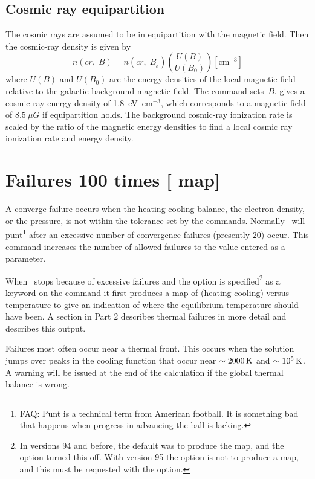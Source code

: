 \subsection{Cosmic ray equipartition}

The cosmic rays are assumed to be in equipartition with the magnetic
field.
Then the cosmic-ray density is given by
\begin{equation}
n\left( {cr,\;B} \right) = n\left( {cr,\;B_{_0 } } \right)\left(
{\frac{{U\left( B \right)}}{{U\left( {B_0 } \right)}}} \right)
[\mathrm{cm}^{-3}]%
\end{equation}
where $U(B)$ and $U(B_0)$ are the energy densities of the local
magnetic field
relative to the galactic background magnetic field.
The 
command sets~$B$.  \citet{Webber1998} gives a cosmic-ray
energy density of 1.8~eV~cm$^{-3}$,
which corresponds to a magnetic field of
$8.5~\mu G$ if equipartition holds.
The background cosmic-ray ionization rate
is scaled by the ratio of the magnetic energy densities to find a local
cosmic ray ionization rate and energy density.

\section{Failures 100 times [ map]}

A converge failure occurs when the heating-cooling balance,
the electron
density, or the pressure, is not within the tolerance set by the
 commands.
Normally \Cloudy\ will
punt\footnote{FAQ:  Punt is a technical term from American football.
It is
something bad that happens when progress in advancing the ball is lacking.}
after an excessive number of convergence failures (presently 20)
occur.
This command increases the number of allowed failures to the value
entered as a parameter.

When \Cloudy\ stops because of excessive failures and the
 option is
specified\footnote{In versions 94 and before,
the default was to produce the map, and
the  option turned this off.
With version 95 the option is not to
produce a map, and this must be requested with the
 option.}
as a keyword on the  command it first
produces a map
of (heating-cooling) versus temperature to give an indication
of where the
equilibrium temperature should have been.
A section in Part 2 describes
thermal failures in more detail and describes this output.

Failures most often occur near a thermal front.
This occurs when the
solution jumps over peaks in the cooling function that occur near
$\sim2000 {\rm\thinspace K}$ and $\sim 10^5 {\rm\thinspace K}$.
A warning will be issued at the end of the calculation if
the global thermal balance is wrong.

